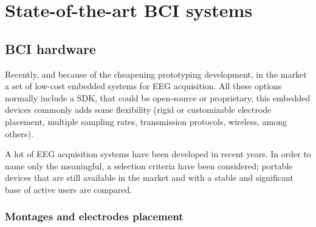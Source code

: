 \section{State-of-the-art \gls*{BCI} systems}\label{sec:state_of_art}

\subsection{BCI hardware}

Recently, and because of the cheapening prototyping development, in the market a set of low-cost embedded systems for \gls*{EEG} acquisition. All these options normally include a \gls*{SDK}, that could be open-source or proprietary, this embedded devices commonly adds some flexibility (rigid or customizable electrode placement, multiple sampling rates, transmission protocols, wireless, among others).

A lot of \gls*{EEG} acquisition systems have been developed in recent years. In order to name only the meaningful, a selection criteria have been considered; portable devices that are still available in the market and with a stable and significant base of active users are compared.



\subsubsection{Montages and electrodes placement}

